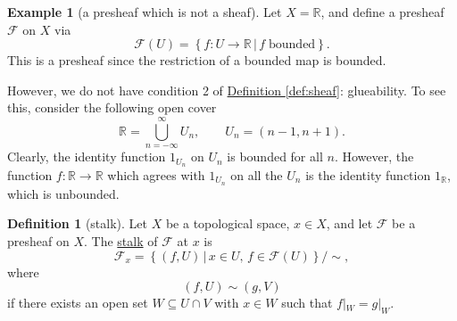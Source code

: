 \documentclass[a4paper]{report}
\newcommand{\R}{\mathbb{R}}
\newcommand{\defn}[1]{\ul{#1}}
\theoremstyle{definition}
\newtheorem{definition}{Definition}[section]
\newtheorem{example}{Example}[section]
\theoremstyle{plain}
\theoremstyle{remark}
\begin{document}
\begin{example}[a presheaf which is not a sheaf]
  \label{eg:presheafwhichisnotasheaf}
  Let $X = \R$, and define a presheaf $\mathcal{F}$ on $X$ via
  \begin{equation*}
    \mathcal{F}(U) = \left\{ f\colon U \to \R\, \big|\, f\;\mathrm{ bounded} \right\}.
  \end{equation*}
  This is a presheaf since the restriction of a bounded map is bounded.

  However, we do not have condition 2 of \hyperref[def:sheaf]{Definition \ref*{def:sheaf}}: glueability. To see this, consider the following open cover
  \begin{equation*}
    \R = \bigcup_{n=-\infty}^{\infty} U_{n}, \qquad U_{n} = (n-1, n+1).
  \end{equation*}
  Clearly, the identity function $1_{U_{n}}$ on $U_{n}$ is bounded for all $n$. However, the function $f:\R \to \R$ which agrees with $1_{U_{n}}$ on all the $U_{n}$ is the identity function $1_{\R}$, which is unbounded.

\end{example}


\begin{definition}[stalk]
  \label{def:stalk}
  Let $X$ be a topological space, $x \in X$, and let $\mathcal{F}$ be a presheaf on $X$. The \defn{stalk} of $\mathcal{F}$ at $x$ is
  \begin{equation*}
    \mathcal{F}_{x} = \left\{ \left( f, U \right)\,\big|\, x \in U,\, f \in \mathcal{F}(U) \right\}/\sim,
  \end{equation*}
  where 
  \begin{equation*}
    \left( f, U \right) \sim \left( g, V \right)
  \end{equation*}
  if there exists an open set $W \subseteq U \cap V$ with $x\in W$ such that $f|_{W} = g|_{W}$.
\end{definition}
\end{document}
